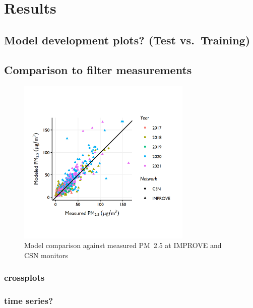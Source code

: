 \documentclass[gmd, manuscript]{copernicus}
\begin{document}
\section{Results}

\subsection{Model development plots? (Test vs.~Training)}

\subsection{Comparison to filter measurements}

\begin{figure}
\includegraphics[width=8.3cm]{./Figures/Model_vs_Filters_FiveEpisodesGMD} \caption{Model comparison against measured PM~2.5 at IMPROVE and CSN monitors}\label{fig:filters}
\end{figure}

\subsubsection{crossplots}

\subsubsection{time series?}
\end{document}
